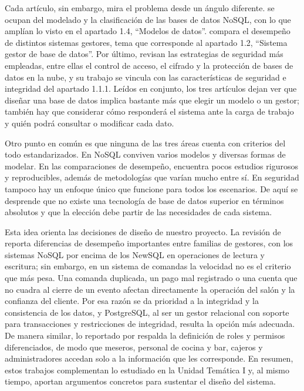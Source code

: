 Cada artículo, sin embargo, mira el problema desde un ángulo diferente. \textcite{aguilar2023} se ocupan del modelado y la clasificación de las bases de datos NoSQL, con lo que amplían lo visto en el apartado 1.4, \enquote{Modelos de datos}. \textcite{taipalus2024} compara el desempeño de distintos sistemas gestores, tema que corresponde al apartado 1.2, \enquote{Sistema gestor de base de datos}. Por último, \textcite{machuca2022} revisan las estrategias de seguridad más empleadas, entre ellas el control de acceso, el cifrado y la protección de bases de datos en la nube, y su trabajo se vincula con las características de seguridad e integridad del apartado 1.1.1. Leídos en conjunto, los tres artículos dejan ver que diseñar una base de datos implica bastante más que elegir un modelo o un gestor; también hay que considerar cómo responderá el sistema ante la carga de trabajo y quién podrá consultar o modificar cada dato.

Otro punto en común es que ninguna de las tres áreas cuenta con criterios del todo estandarizados. En NoSQL conviven varios modelos y diversas formas de modelar. En las comparaciones de desempeño, \textcite{taipalus2024} encuentra pocos estudios rigurosos y reproducibles, además de metodologías que varían mucho entre sí. En seguridad tampoco hay un enfoque único que funcione para todos los escenarios. De aquí se desprende que no existe una tecnología de base de datos superior en términos absolutos y que la elección debe partir de las necesidades de cada sistema.

Esta idea orienta las decisiones de diseño de nuestro proyecto. La revisión de \textcite{taipalus2024} reporta diferencias de desempeño importantes entre familias de gestores, con los sistemas NoSQL por encima de los NewSQL en operaciones de lectura y escritura; sin embargo, en un sistema de comandas la velocidad no es el criterio que más pesa. Una comanda duplicada, un pago mal registrado o una cuenta que no cuadra al cierre de un evento afectan directamente la operación del salón y la confianza del cliente. Por esa razón se da prioridad a la integridad y la consistencia de los datos, y PostgreSQL, al ser un gestor relacional con soporte para transacciones y restricciones de integridad, resulta la opción más adecuada. De manera similar, lo reportado por \textcite{machuca2022} respalda la definición de roles y permisos diferenciados, de modo que meseros, personal de cocina y bar, cajeros y administradores accedan solo a la información que les corresponde. En resumen, estos trabajos complementan lo estudiado en la Unidad Temática I y, al mismo tiempo, aportan argumentos concretos para sustentar el diseño del sistema.


